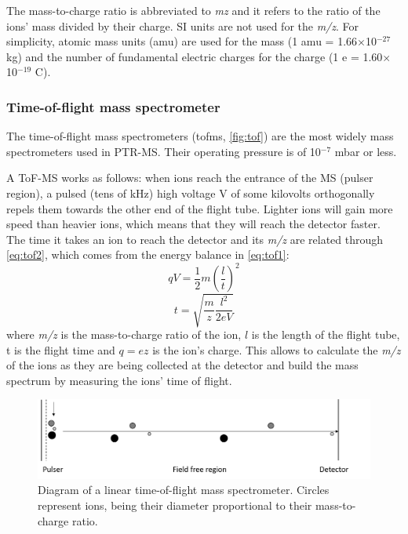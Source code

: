 The mass-to-charge ratio is abbreviated to \textit{\acrshort{mz}} and it refers to the ratio of the ions' mass divided by their charge. SI units are not used for the \textit{m/z}. For simplicity, atomic mass units (\acrshort{amu}) are used for the mass (1 amu = 1.66$\times$10$^{-27}$ kg) and the number of fundamental electric charges for the charge (1 e = 1.60$\times$10$^{-19}$ C). 

\subsubsection{Time-of-flight mass spectrometer}
The time-of-flight mass spectrometers  (\acrshort{tofms}, \autoref{fig:tof})  are  the most widely mass spectrometers used in PTR-MS. 
%
Their operating pressure is of 10$^{-7}$ mbar or less.

A ToF-MS works as follows: when ions reach the entrance of the MS (pulser region), a pulsed (tens of kHz) high voltage V of some kilovolts orthogonally repels them towards the other end of the flight tube. Lighter ions will gain more speed than heavier ions, which means that they will reach the detector faster. The time it takes an ion to reach the detector and its \textit{m/z} are related through \autoref{eq:tof2}, which comes from the energy balance in \autoref{eq:tof1}:
%
\begin{equation}
\label{eq:tof1}
qV =  \frac{1}{2} m\left(\frac{l}{t}\right)^2
\end{equation}
\begin{equation}
\label{eq:tof2}
t= \sqrt{\frac{m}{z} \frac{l^2}{2eV}}
\end{equation}
where \textit{m/z} is the mass-to-charge ratio of the ion, $l$ is the length of the flight tube, t is the flight time and $q = e z$ is the ion's charge.
This allows to calculate the \textit{m/z} of the ions as they are being collected at the detector and build the mass spectrum by measuring the ions' time of flight.



\begin{figure}%
\centering
\includegraphics[width=0.8\linewidth]{pics/tofms.png}
\centering
\caption[Diagram of a linear time-of-flight mass spectrometer.]{Diagram of a linear time-of-flight mass spectrometer. Circles represent ions, being their diameter proportional to their mass-to-charge ratio.}
\label{fig:tof}
\end{figure}



